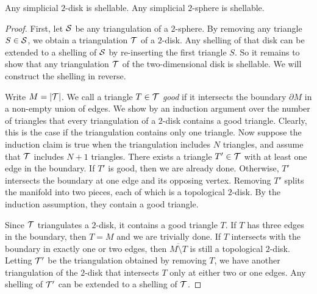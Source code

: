 \documentclass[a4paper]{article}
\begin{document}
\begin{lemma}    
    Any simplicial $2$-disk is shellable.
    Any simplicial $2$-sphere is shellable. 
\end{lemma}
\begin{proof}
    First, 
    let ${\mathcal S}$ be any triangulation of a $2$-sphere. 
    By removing any triangle $S \in {\mathcal S}$, we obtain a triangulation ${\mathcal T}$ of a $2$-disk.
    Any shelling of that disk can be extended to a shelling of ${\mathcal S}$ by re-inserting the first triangle $S$.
    So it remains to show that any triangulation ${\mathcal T}$ of the two-dimensional disk is shellable. 
    We will construct the shelling in reverse. 
    
    Write $M = |{\mathcal T}|$. 
    We call a triangle $T \in {\mathcal T}$ \emph{good} if it intersects the boundary $\partial M$ in a non-empty union of edges. 
    We show by an induction argument over the number of triangles that every triangulation of a $2$-disk contains a good triangle. 
    Clearly, this is the case if the triangulation contains only one triangle. 
    Now suppose the induction claim is true when the triangulation includes $N$ triangles,
    and assume that ${\mathcal T}$ includes $N+1$ triangles. 
    There exists a triangle $T' \in {\mathcal T}$ with at least one edge in the boundary. 
    If $T'$ is good, then we are already done. 
    Otherwise, $T'$ intersects the boundary at one edge and its opposing vertex.
    Removing $T'$ splits the manifold into two pieces, each of which is a topological $2$-disk.
    By the induction assumption, they contain a good triangle.
    
    Since ${\mathcal T}$ triangulates a $2$-disk,
    it contains a good triangle $T$. 
    If $T$ has three edges in the boundary, then $T = M$ and we are trivially done. 
    If $T$ intersects with the boundary in exactly one or two edges, 
    then $\overline{M \setminus T}$ is still a topological $2$-disk.
    Letting ${\mathcal T}'$ be the triangulation obtained by removing $T$,
    we have another triangulation of the $2$-disk that intersects $T$ only at either two or one edges.
    Any shelling of ${\mathcal T}'$ can be extended to a shelling of ${\mathcal T}$.
%   
\end{proof}
\end{document}
